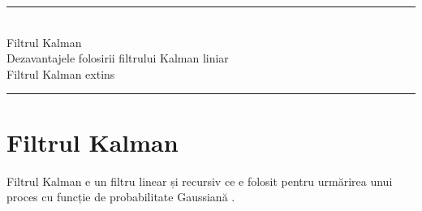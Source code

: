 
\noindent\rule{14.7cm}{0.4pt}\\
\-\hspace{1cm}Filtrul Kalman\\
\-\hspace{1cm}Dezavantajele folosirii filtrului Kalman liniar\\
\-\hspace{1cm}Filtrul Kalman extins\\
\noindent\rule{14.7cm}{0.4pt}
\label{Chapter5} %
%
%


\fancyhead[R]{\fontsize{12}{12}\selectfont\emph\bfseries\textcolor{black!70}{Automatică şi \\ Informatică Aplicată}}


\section{Filtrul Kalman}

\-\hspace{1cm}Filtrul Kalman e un filtru linear și recursiv ce e folosit pentru urmărirea unui proces cu funcție de probabilitate Gaussiană \cite{quatro}.

